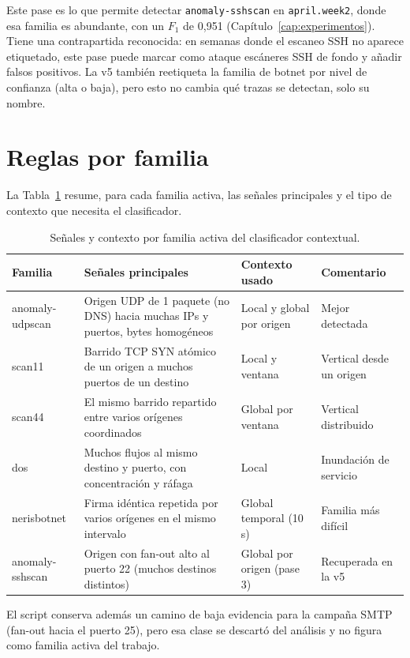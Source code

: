 Este pase es lo que permite detectar \texttt{anomaly-sshscan} en \texttt{april.week2}, donde esa familia es abundante, con un $F_1$ de 0,951 (Capítulo~\ref{cap:experimentos}). Tiene una contrapartida reconocida: en semanas donde el escaneo SSH no aparece etiquetado, este pase puede marcar como ataque escáneres SSH de fondo y añadir falsos positivos. La v5 también reetiqueta la familia de botnet por nivel de confianza (alta o baja), pero esto no cambia qué trazas se detectan, solo su nombre.

\section{Reglas por familia}
\label{sec:apd_familias}

La Tabla~\ref{tab:apd_familia} resume, para cada familia activa, las señales principales y el tipo de contexto que necesita el clasificador.

\begin{table}[ht]
\centering
\small
\begin{tabular}{|l|p{5.4cm}|p{2.8cm}|p{2.4cm}|}
\hline
\textbf{Familia} & \textbf{Señales principales} & \textbf{Contexto usado} & \textbf{Comentario} \\
\hline
anomaly-udpscan & Origen UDP de 1 paquete (no DNS) hacia muchas IPs y puertos, bytes homogéneos & Local y global por origen & Mejor detectada \\
\hline
scan11 & Barrido TCP SYN atómico de un origen a muchos puertos de un destino & Local y ventana & Vertical desde un origen \\
\hline
scan44 & El mismo barrido repartido entre varios orígenes coordinados & Global por ventana & Vertical distribuido \\
\hline
dos & Muchos flujos al mismo destino y puerto, con concentración y ráfaga & Local & Inundación de servicio \\
\hline
nerisbotnet & Firma idéntica repetida por varios orígenes en el mismo intervalo & Global temporal (10 s) & Familia más difícil \\
\hline
anomaly-sshscan & Origen con fan-out alto al puerto 22 (muchos destinos distintos) & Global por origen (pase 3) & Recuperada en la v5 \\
\hline
\end{tabular}
\caption{Señales y contexto por familia activa del clasificador contextual.}
\label{tab:apd_familia}
\end{table}

El script conserva además un camino de baja evidencia para la campaña SMTP (fan-out hacia el puerto 25), pero esa clase se descartó del análisis y no figura como familia activa del trabajo.

